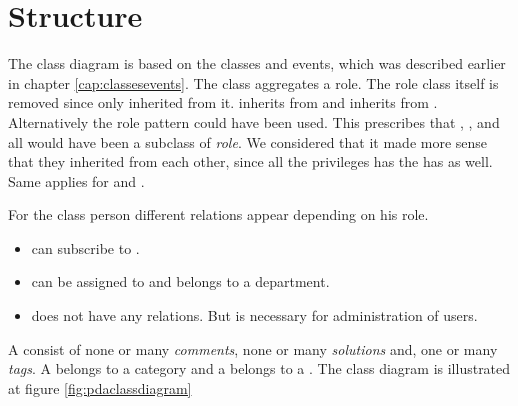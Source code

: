 \section{Structure}
\label{sec:problem_structure}
The class diagram is based on the classes and events, which was described earlier in chapter \ref{cap:classesevents}. The class  aggregates a role. The role class itself is removed since only \class{\client[]} inherited from it. \class{\staff[]} inherits from \class{\client[]} and \class{\admin[]} inherits from \cl{\client[]}. Alternatively the role pattern \cite[p. 80]{roedeaalborg} could have been used. This prescribes that \class{\admin[]}, \class{\client[]}, and \class{\staff[]} all would have been a subclass of \textit{role}. We considered that it made more sense that they inherited from each other, since all the privileges \class{\staff[]} has the \class{\admin[]} has as well. Same applies for \class{\staff[]} and \cl{\client[]}.  

For the class person different relations appear depending on his role. 
\begin{itemize}
\item {} can subscribe to .
\item \class{\staff[]} can be assigned to  and \class{\staff[]} belongs to a department. 
\item \class{\admin[]} does not have any relations. But is necessary for administration of users.  
\end{itemize}

A \problem[] consist of none or many \textit{comments}, none or many \textit{solutions} and, one or many \textit{tags}. A  belongs to a category and a  belongs to a .  The class diagram is illustrated at figure \ref{fig:pdaclassdiagram}

